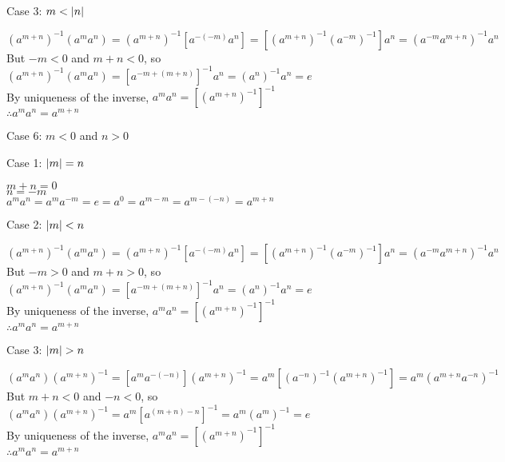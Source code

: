 \documentclass[letterpaper,12pt,fleqn]{article}
\begin{document}
\begin{theproof}
\begin{description}
\begin{description}
    \item{Case 3: $m<\lvert n\rvert$}

      $(a^{m+n})^{-1}(a^ma^n)=(a^{m+n})^{-1}[a^{-(-m)}a^n]=
      [(a^{m+n})^{-1}(a^{-m})^{-1}]a^n=(a^{-m}a^{m+n})^{-1}a^n$ \\
      But $-m<0$ and $m+n<0$, so \\
      $(a^{m+n})^{-1}(a^ma^n)=[a^{-m+(m+n)}]^{-1}a^n=(a^n)^{-1}a^n=e$ \\
      By uniqueness of the inverse, $a^ma^n=[(a^{m+n})^{-1}]^{-1}$ \\
      $\therefore a^ma^n=a^{m+n}$
    \end{description}

  \item{Case 6: $m<0$ and $n>0$}

    \begin{description}
    \item{Case 1: $\lvert m\rvert=n$}

      $m+n=0$ \\
      $n=-m$ \\
      $a^ma^n=a^ma^{-m}=e=a^0=a^{m-m}=a^{m-(-n)}=a^{m+n}$

    \item{Case 2: $\lvert m\rvert<n$}

      $(a^{m+n})^{-1}(a^ma^n)=(a^{m+n})^{-1}[a^{-(-m)}a^n]=
      [(a^{m+n})^{-1}(a^{-m})^{-1}]a^n=(a^{-m}a^{m+n})^{-1}a^n$ \\
      But $-m>0$ and $m+n>0$, so \\
      $(a^{m+n})^{-1}(a^ma^n)=[a^{-m+(m+n)}]^{-1}a^n=(a^n)^{-1}a^n=e$ \\
      By uniqueness of the inverse, $a^ma^n=[(a^{m+n})^{-1}]^{-1}$ \\
      $\therefore a^ma^n=a^{m+n}$

    \item{Case 3: $\lvert m\rvert>n$}

      $(a^ma^n)(a^{m+n})^{-1}=[a^ma^{-(-n)}](a^{m+n})^{-1}=
      a^m[(a^{-n})^{-1}(a^{m+n})^{-1}]=a^m(a^{m+n}a^{-n})^{-1}$ \\
      But $m+n<0$ and $-n<0$, so \\
      $(a^ma^n)(a^{m+n})^{-1}=a^m[a^{(m+n)-n}]^{-1}=a^m(a^m)^{-1}=e$ \\
      By uniqueness of the inverse, $a^ma^n=[(a^{m+n})^{-1}]^{-1}$ \\
      $\therefore a^ma^n=a^{m+n}$
    \end{description}
  \end{description}
\end{theproof}
\end{document}
